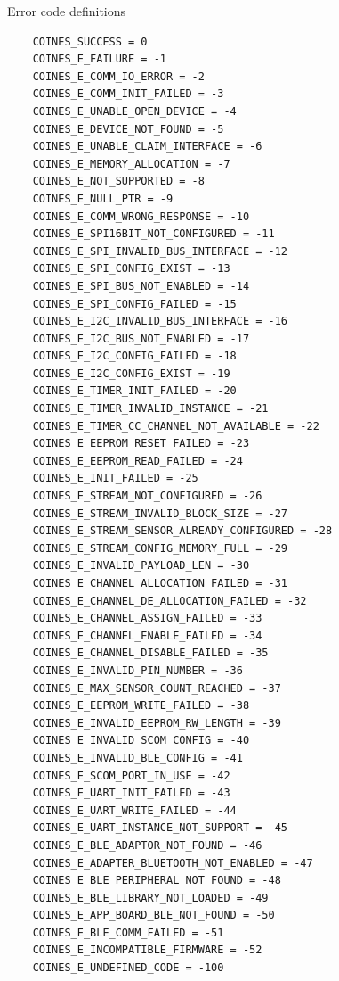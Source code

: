 \documentclass[11pt,headings=small]{scrartcl}
\begin{document}
Error code definitions
\begin{lstlisting}
    COINES_SUCCESS = 0
    COINES_E_FAILURE = -1
    COINES_E_COMM_IO_ERROR = -2
    COINES_E_COMM_INIT_FAILED = -3
    COINES_E_UNABLE_OPEN_DEVICE = -4
    COINES_E_DEVICE_NOT_FOUND = -5
    COINES_E_UNABLE_CLAIM_INTERFACE = -6
    COINES_E_MEMORY_ALLOCATION = -7
    COINES_E_NOT_SUPPORTED = -8
    COINES_E_NULL_PTR = -9
    COINES_E_COMM_WRONG_RESPONSE = -10
    COINES_E_SPI16BIT_NOT_CONFIGURED = -11
    COINES_E_SPI_INVALID_BUS_INTERFACE = -12
    COINES_E_SPI_CONFIG_EXIST = -13
    COINES_E_SPI_BUS_NOT_ENABLED = -14
    COINES_E_SPI_CONFIG_FAILED = -15
    COINES_E_I2C_INVALID_BUS_INTERFACE = -16
    COINES_E_I2C_BUS_NOT_ENABLED = -17
    COINES_E_I2C_CONFIG_FAILED = -18
    COINES_E_I2C_CONFIG_EXIST = -19
    COINES_E_TIMER_INIT_FAILED = -20
    COINES_E_TIMER_INVALID_INSTANCE = -21
    COINES_E_TIMER_CC_CHANNEL_NOT_AVAILABLE = -22
    COINES_E_EEPROM_RESET_FAILED = -23
    COINES_E_EEPROM_READ_FAILED = -24
    COINES_E_INIT_FAILED = -25
    COINES_E_STREAM_NOT_CONFIGURED = -26
    COINES_E_STREAM_INVALID_BLOCK_SIZE = -27
    COINES_E_STREAM_SENSOR_ALREADY_CONFIGURED = -28
    COINES_E_STREAM_CONFIG_MEMORY_FULL = -29
    COINES_E_INVALID_PAYLOAD_LEN = -30
    COINES_E_CHANNEL_ALLOCATION_FAILED = -31
    COINES_E_CHANNEL_DE_ALLOCATION_FAILED = -32
    COINES_E_CHANNEL_ASSIGN_FAILED = -33
    COINES_E_CHANNEL_ENABLE_FAILED = -34
    COINES_E_CHANNEL_DISABLE_FAILED = -35
    COINES_E_INVALID_PIN_NUMBER = -36
    COINES_E_MAX_SENSOR_COUNT_REACHED = -37
    COINES_E_EEPROM_WRITE_FAILED = -38
    COINES_E_INVALID_EEPROM_RW_LENGTH = -39
    COINES_E_INVALID_SCOM_CONFIG = -40
    COINES_E_INVALID_BLE_CONFIG = -41
    COINES_E_SCOM_PORT_IN_USE = -42
    COINES_E_UART_INIT_FAILED = -43
    COINES_E_UART_WRITE_FAILED = -44
    COINES_E_UART_INSTANCE_NOT_SUPPORT = -45
    COINES_E_BLE_ADAPTOR_NOT_FOUND = -46
    COINES_E_ADAPTER_BLUETOOTH_NOT_ENABLED = -47
    COINES_E_BLE_PERIPHERAL_NOT_FOUND = -48
    COINES_E_BLE_LIBRARY_NOT_LOADED = -49
    COINES_E_APP_BOARD_BLE_NOT_FOUND = -50
    COINES_E_BLE_COMM_FAILED = -51
    COINES_E_INCOMPATIBLE_FIRMWARE = -52
    COINES_E_UNDEFINED_CODE = -100
\end{lstlisting}
\end{document}
